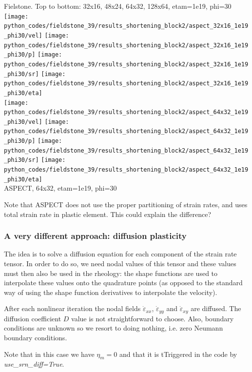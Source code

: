 \begin{center}
{\captionfont Fielstone. Top to bottom: 32x16, 48x24, 64x32, 128x64, etam=1e19, phi=30}\\
\texttt{[image: python\_codes/fieldstone\_39/results\_shortening\_block2/aspect\_32x16\_1e19\_phi30/vel]}
\texttt{[image: python\_codes/fieldstone\_39/results\_shortening\_block2/aspect\_32x16\_1e19\_phi30/p]}
\texttt{[image: python\_codes/fieldstone\_39/results\_shortening\_block2/aspect\_32x16\_1e19\_phi30/sr]}
\texttt{[image: python\_codes/fieldstone\_39/results\_shortening\_block2/aspect\_32x16\_1e19\_phi30/eta]}\\
\texttt{[image: python\_codes/fieldstone\_39/results\_shortening\_block2/aspect\_64x32\_1e19\_phi30/vel]}
\texttt{[image: python\_codes/fieldstone\_39/results\_shortening\_block2/aspect\_64x32\_1e19\_phi30/p]}
\texttt{[image: python\_codes/fieldstone\_39/results\_shortening\_block2/aspect\_64x32\_1e19\_phi30/sr]}
\texttt{[image: python\_codes/fieldstone\_39/results\_shortening\_block2/aspect\_64x32\_1e19\_phi30/eta]}\\
{\captionfont ASPECT, 64x32, etam=1e19, phi=30}\\
\end{center}

Note that ASPECT does not use the proper partitioning of strain rates, and uses total strain rate 
in plastic element. This could explain the difference?



\clearpage
\subsubsection*{A very different approach: diffusion plasticity}

The idea is to solve a diffusion equation for each component of the strain rate tensor. In 
order to do so, we need nodal values of this tensor and these values must then also be used in 
the rheology: the shape functions are used to interpolate these values onto the quadrature points
(as opposed to the standard way of using the shape function derivatives to interpolate the velocity). 

After each nonlinear iteration the nodal fields $\dot{\varepsilon}_{xx}$, $\dot{\varepsilon}_{yy}$ 
and $\dot{\varepsilon}_{xy}$ are diffused. The diffusion coefficient $D$ value is not straightforward
to choose. Also, boundary conditions are unknown so we resort to doing nothing, i.e. zero Neumann 
boundary conditions.

Note that in this case we have $\eta_m=0$ and that it is tTriggered in the code 
by {\sl use\_srn\_diff=True}.

